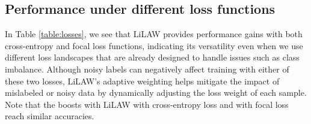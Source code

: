 \documentclass{article}
\theoremstyle{plain}
\theoremstyle{definition}
\theoremstyle{remark}
\begin{document}
\subsection{Performance under different loss functions}
\label{supp:loss}

In Table \ref{table:losses}, we see that LiLAW provides performance gains with both cross-entropy and focal loss functions, indicating its versatility even when we use different loss landscapes that are already designed to handle issues such as class imbalance. Although noisy labels can negatively affect training with either of these two losses, LiLAW's adaptive weighting helps mitigate the impact of mislabeled or noisy data by dynamically adjusting the loss weight of each sample. Note that the boosts with LiLAW with cross-entropy loss and with focal loss reach similar accuracies.

\begin{table}[h!] \centering {} \caption{Results of two loss functions with varying levels of symmetric noise on CIFAR-100-M. \label{table:losses}} \end{table}
\end{document}
